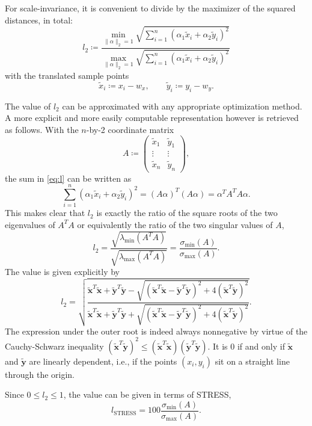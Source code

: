 \documentclass{scrartcl}
\newtheorem*{remark}{Remark}
\theoremstyle{named}
\newcommand\xt{\ensuremath{\bm{\tilde{x}}}}
\newcommand\yt{\ensuremath{\bm{\tilde{y}}}}
\begin{document}
For scale-invariance, it is convenient to divide by the maximizer of the squared
distances, in total:
\begin{equation}\label{eq:l}
l_2 \coloneqq
  \frac{
\min_{\|\alpha\|_2=1}
  \sqrt{\sum_{i=1}^n (\alpha_1 \tilde{x}_i + \alpha_2 \tilde{y}_i)^2}
}{
\max_{\|\alpha\|_2=1}
  \sqrt{\sum_{i=1}^n (\alpha_1 \tilde{x}_i + \alpha_2 \tilde{y}_i)^2}
}
\end{equation}
with the translated sample points
\[
  \tilde{x}_i \coloneqq x_i-w_x,\qquad
  \tilde{y}_i \coloneqq y_i-w_y.
\]

The value of $l_2$ can be approximated with any appropriate optimization method. A more
explicit and more easily computable representation however is retrieved as follows.
With the $n$-by-2 coordinate matrix
\[
  A \coloneqq \begin{pmatrix}
    \tilde{x}_1 & \tilde{y}_1\\
    \vdots & \vdots\\
    \tilde{x}_n & \tilde{y}_n
  \end{pmatrix},
\]
the sum in \eqref{eq:l} can be written as
\[
  \sum_{i=1}^n (\alpha_1 \tilde{x}_i + \alpha_2 \tilde{y}_i)^2
  = (A \alpha)^T (A \alpha)
  = \alpha^T A^T A \alpha.
\]
This makes clear that $l_2$ is exactly the ratio of the square roots of the two
eigenvalues of $A^TA$ or equivalently the ratio of the two singular values of $A$,
\[
l_2
= \frac{
  \sqrt{\lambda_{\min}(A^T A)}
  }{
    \sqrt{\lambda_{\max}(A^T A)}
  }
= \frac{\sigma_{\min}(A)}{\sigma_{\max}(A)}.
\]
The value is given explicitly by
\begin{equation*}
  l_2 = \sqrt{
    \frac{
      \xt^T\xt
      + \yt^T\yt
      - \sqrt{(\xt^T\xt - \yt^T\yt)^2 + 4 (\xt^T\yt)^2}
    }{
      \xt^T\xt
      + \yt^T\yt
      + \sqrt{(\xt^T\xt - \yt^T\yt)^2 + 4 (\xt^T\yt)^2}
    }
    }.
\end{equation*}
The expression under the outer root is indeed always nonnegative by virtue of the
Cauchy-Schwarz inequality $(\xt^T\yt)^2 \le (\xt^T\xt) (\yt^T\yt)$. It is 0 if and only
if $\xt$ and $\yt$ are linearly dependent, i.e., if the points $(x_i, y_i)$ sit on a
straight line through the origin.

Since $0\le l_2\le 1$, the value can be given in terms of STRESS,
\begin{equation}\label{eq:lstress}
  l_\text{STRESS} = 100 \frac{\sigma_{\min}(A)}{\sigma_{\max}(A)}.
\end{equation}


\end{document}

